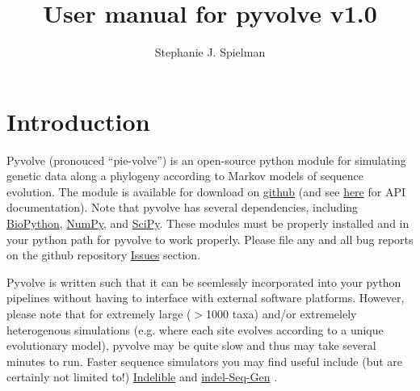 \documentclass{article}
\begin{document}
\title{User manual for pyvolve v1.0}
\author{Stephanie J. Spielman}
\date{}
\maketitle

\tableofcontents

\section{Introduction}

Pyvolve (pronouced ``pie-volve'') is an open-source python module for simulating genetic data along a phylogeny according to Markov models of sequence evolution. The module is available for download on \href{https://github.com/sjspielman/pyvolve/releases}{github} (and see \href{http://sjspielman.org/pyvolve/}{here} for API documentation). Note that pyvolve has several dependencies, including \href{http://biopython.org/wiki/Download}{BioPython}, \href{http://www.scipy.org/install.html}{NumPy}, and \href{http://www.scipy.org/install.html}{SciPy}. These modules must be properly installed and in your python path for pyvolve to work properly. Please file any and all bug reports on the github repository \href{https://github.com/sjspielman/pyvolve/issues}{Issues} section.

Pyvolve is written such that it can be seemlessly incorporated into your python pipelines without having to interface with external software platforms. However, please note that for extremely large ($>$1000 taxa) and/or extremelely heterogenous simulations (e.g. where each site evolves according to a unique evolutionary model), pyvolve may be quite slow and thus may take several minutes to run. Faster sequence simulators you may find useful include (but are certainly not limited to!) \href{http://abacus.gene.ucl.ac.uk/software/indelible/}{Indelible} \cite{Fletcher2009} and  \href{http://bioinfolab.unl.edu/~cstrope/iSG/}{indel-Seq-Gen} \cite{Strope2007}. 
\end{document}
